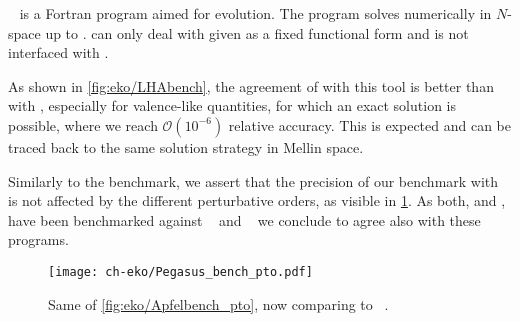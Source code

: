 \pegasus{}~\cite{Vogt:2004ns} is a Fortran program aimed for \pdf{} evolution.
The program solves \dglap{} numerically in $N$-space up to \nnlo{}.
\pegasus{} can only deal with \pdfs given as a fixed functional form and is
not interfaced with \lhapdf{}.

As shown in \cref{fig:eko/LHAbench}, the agreement of \eko{} with this tool is better than with \apfel{},
especially for valence-like quantities, for which an exact solution is possible, where we reach
$\mathcal{O}(10^{-6})$ relative accuracy.
This is expected and can be traced back to the same \dglap{} solution strategy in Mellin space.

Similarly to the \apfel{} benchmark, we assert that the precision of our benchmark with \pegasus{} is not affected
by the different \qcd{} perturbative orders, as visible in \cref{fig:eko/Pegasusbench_pto}.
As both, \apfel{} and \pegasus{}, have been benchmarked against
\hoppet{}~\cite{Salam:2008qg} and \qcdnum{}~\cite{Botje:2010ay} we conclude
to agree also with these programs.

\begin{figure}
    \texttt{[image: ch-eko/Pegasus\_bench\_pto.pdf]}
    \caption{Same of \cref{fig:eko/Apfelbench_pto}, now comparing to \pegasus{}~\cite{Vogt:2004ns}.
        \label{fig:eko/Pegasusbench_pto} }
\end{figure}
